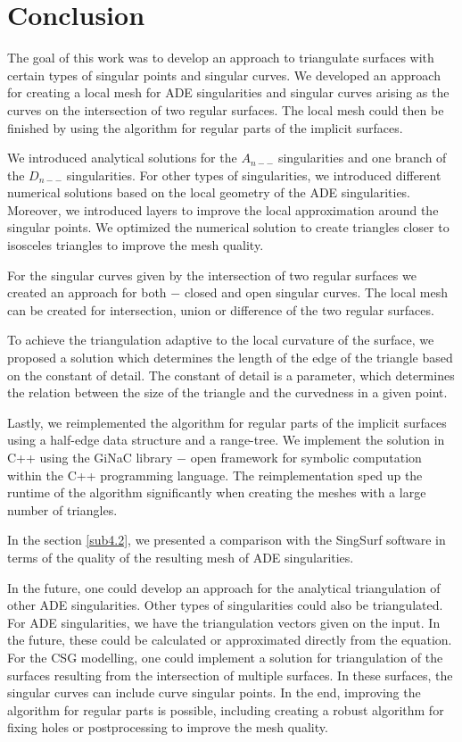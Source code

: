 \chapter*{Conclusion}  %
The goal of this work was to develop an approach to triangulate
surfaces with certain types of singular points and singular curves.
We developed an approach for creating a local mesh for ADE singularities
and singular curves arising as the curves on the intersection of two regular
surfaces.
The local mesh could then be finished by using the 
algorithm for regular parts of the implicit surfaces.

We introduced analytical solutions for the $A_{n--}$ singularities and
one branch of the $D_{n--}$ singularities. For other types of singularities, we 
introduced different numerical solutions based on the local geometry of 
the ADE singularities. Moreover, we introduced layers to improve the local 
approximation around the singular points. We optimized the numerical solution
to create triangles closer to isosceles triangles to improve the 
mesh quality.

For the singular curves given by the intersection of two regular surfaces
we created an approach for both $-$ closed and open singular curves.
The local mesh can be created for intersection, union or difference of the
two regular surfaces.

To achieve the triangulation adaptive to the local curvature of the surface,
we proposed a solution which determines the length of the edge of the triangle
based on the constant of detail. The constant of detail is a parameter,
which determines the relation between the size of the triangle and the curvedness
in a given point.

Lastly, we reimplemented the algorithm for regular parts of the implicit surfaces
using a half-edge data structure and a range-tree. We implement the solution in C++
using the GiNaC library \cite{bauer2002introduction} $-$ open framework for symbolic 
computation within the C++ programming language.
The reimplementation sped up the runtime of the algorithm significantly when creating the meshes with a large number
of triangles.

In the section \ref{sub4.2}, we presented a comparison with the SingSurf software 
\cite{morris2003client} in terms of the quality of the resulting mesh of ADE singularities.

In the future, one could develop an approach for the analytical triangulation of 
other ADE singularities. Other types of singularities could also be triangulated. 
For ADE singularities, we have the triangulation vectors given on 
the input. In the future, these could be calculated or approximated directly from 
the equation. For the CSG modelling, one could implement a solution for triangulation of 
the surfaces resulting from the intersection of multiple surfaces. In these surfaces, 
the singular curves can include curve singular points. In the end,
improving the algorithm for regular parts is possible, including
creating a robust algorithm for fixing holes or postprocessing to improve the
mesh quality.

